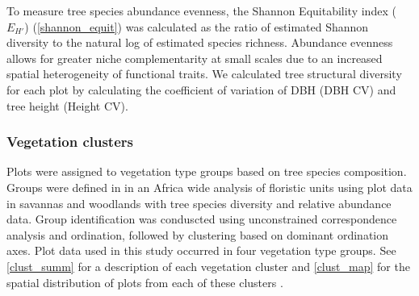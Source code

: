 \documentclass[11pt,a4paper]{article}
\begin{document}
To measure tree species abundance evenness, the Shannon Equitability index ($E_{H'}$) \citep{Smith1996} (\autoref{shannon_equit}) was calculated as the ratio of estimated Shannon diversity to the natural log of estimated species richness. Abundance evenness allows for greater niche complementarity at small scales due to an increased spatial heterogeneity of functional traits. We calculated tree structural diversity for each plot by calculating the coefficient of variation of DBH (DBH CV) and tree height (Height CV). 

% 


\subsubsection*{Vegetation clusters}

Plots were assigned to vegetation type groups based on tree species composition. Groups were defined in \citet{Fayolle2018} in an Africa wide analysis of floristic units using plot data in savannas and woodlands with tree species diversity and relative abundance data. Group identification was conduscted using unconstrained correspondence analysis and ordination, followed by clustering based on dominant ordination axes. Plot data used in this study occurred in four vegetation type groups. See \autoref{clust_summ} for a description of each vegetation cluster and \autoref{clust_map} for the spatial distribution of plots from each of these clusters .
\end{document}
